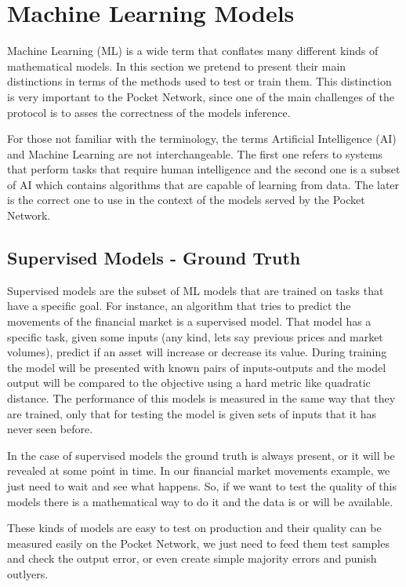 
\section{Machine Learning Models}\label{sec:ref}

Machine Learning (ML) is a wide term that conflates many different kinds of mathematical models. In this section we pretend to present their main distinctions in terms of the methods used to test or train them. This distinction is very important to the Pocket Network, since one of the main challenges of the protocol is to asses the correctness of the models inference. 

For those not familiar with the terminology, the terms Artificial Intelligence (AI) and Machine Learning are not interchangeable. The first one refers to systems that perform tasks that require human intelligence and the second one is a subset of AI which contains algorithms that are capable of learning from data. The later is the correct one to use in the context of the models served by the Pocket Network.

\subsection{Supervised Models - Ground Truth}
Supervised models are the subset of ML models that are trained on tasks that have a specific goal. For instance, an algorithm that tries to predict the movements of the financial market is a supervised model. That model has a specific task, given some inputs (any kind, lets say previous prices and market volumes), predict if an asset will increase or decrease its value. During training the model will be presented with known pairs of inputs-outputs and the model output will be compared to the objective using a hard metric like quadratic distance.
The performance of this models is measured in the same way that they are trained, only that for testing the model is given sets of inputs that it has never seen before.

In the case of supervised models the ground truth is always present, or it will be revealed at some point in time. In our financial market movements example, we just need to wait and see what happens. So, if we want to test the quality of this models there is a mathematical way to do it and the data is or will be available. 

These kinds of models are easy to test on production and their quality can be measured easily on the Pocket Network, we just need to feed them test samples and check the output error, or even create simple majority errors and punish outlyers.

